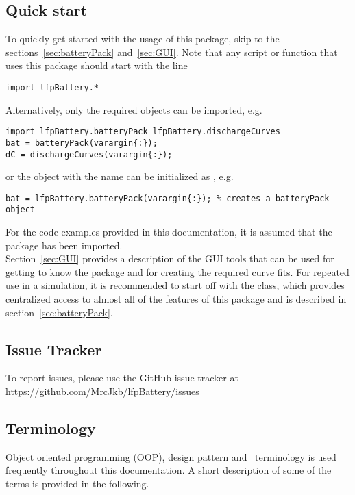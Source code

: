 \subsection*{Quick start}
To quickly get started with the usage of this package, skip to the sections~\ref{sec:batteryPack} and~\ref{sec:GUI}. Note that any script or function that uses this package should start with the line
\begin{lstlisting}
import lfpBattery.*
\end{lstlisting}
Alternatively, only the required objects can be imported, e.g.
\begin{lstlisting}
import lfpBattery.batteryPack lfpBattery.dischargeCurves
bat = batteryPack(varargin{:});
dC = dischargeCurves(varargin{:});
\end{lstlisting}
or the object with the name  can be initialized as , e.g.
\begin{lstlisting}
bat = lfpBattery.batteryPack(varargin{:}); % creates a batteryPack object
\end{lstlisting}
For the code examples provided in this documentation, it is assumed that the  package has been imported. \\
Section~\ref{sec:GUI} provides a description of the GUI tools that can be used for getting to know the package and for creating the required curve fits. For repeated use in a simulation, it is recommended to start off with the  class, which provides centralized access to almost all of the features of this package and is described in section~\ref{sec:batteryPack}.

\subsection*{Issue Tracker}
To report issues, please use the GitHub issue tracker at \url{https://github.com/MrcJkb/lfpBattery/issues}

\subsection*{Terminology}
Object oriented programming (OOP), design pattern and \matlab\ terminology is used frequently throughout this documentation. A short description of some of the terms is provided in the following.

